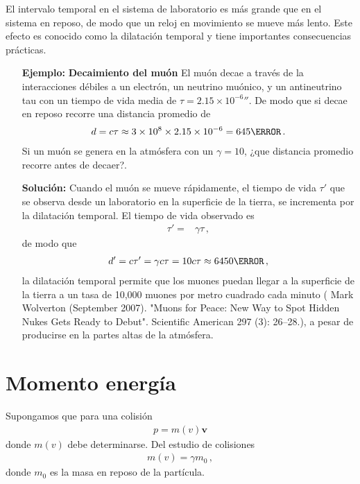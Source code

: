 El intervalo temporal en el sistema de laboratorio es más grande que en el sistema en reposo, de modo que un reloj en movimiento se mueve más lento. Este efecto es conocido como la dilatación temporal y tiene importantes consecuencias prácticas.

\begin{itemize}
\item[\textbf{Ejemplo:}] \textbf{Decaimiento del muón} El muón decae a través de la interacciones débiles a un electrón, un neutrino muónico, y un antineutrino tau con un tiempo de vida media de $\tau=2.15\times 10^{-6}\second$. De modo que si decae en reposo recorre una distancia promedio de
  \begin{align*}
    d=c\tau\approx 3\times 10^8\times 2.15\times 10^{-6}=645\meter\,. 
  \end{align*}
Si un muón se genera en la atmósfera con un $\gamma=10$, ¿que distancia promedio recorre antes de decaer?.
\item[\textbf{Solución:}] Cuando el muón se mueve rápidamente, el tiempo de vida $\tau'$ que se observa desde un laboratorio en la superficie de la tierra, se incrementa por la dilatación temporal. El tiempo de vida observado es
  \begin{align*}
    \tau'=&\gamma\tau\,,
  \end{align*}
de modo que
\begin{align*}
  d'=c\tau'=\gamma c\tau=10 c\tau\approx 6450\meter\,,
\end{align*}
la dilatación temporal permite que los muones puedan llegar a la superficie de la tierra a un tasa de 10,000 muones por metro cuadrado cada minuto ( Mark Wolverton (September 2007). "Muons for Peace: New Way to Spot Hidden Nukes Gets Ready to Debut". Scientific American 297 (3): 26–28.), a pesar de producirse en la partes altas de la atmósfera.
\end{itemize}

\section{Momento energía}
Supongamos que para una colisión
\begin{align*}
  p=m(v)\mathbf{v}
\end{align*}
donde $m(v)$ debe determinarse. Del estudio de colisiones
\begin{align*}
  m(v)=\gamma m_0\,,
\end{align*}
donde $m_0$ es la masa en reposo de la partícula.


